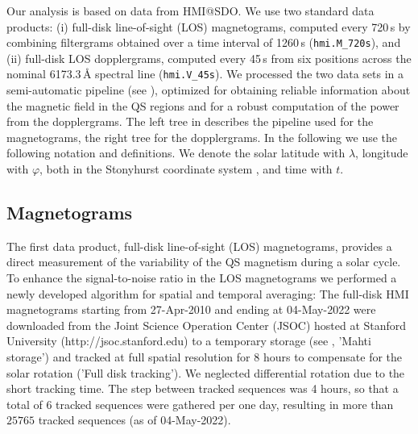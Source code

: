 \documentclass{aa}
\begin{document}
Our analysis is based on data from HMI@SDO. We use two standard data products: (i) full-disk line-of-sight (LOS) magnetograms, computed every 720\,s by combining filtergrams obtained over a time interval of 1260\,s (\texttt{hmi.M\_720s}), and (ii) full-disk LOS dopplergrams, computed every 45\,s from six positions across the nominal 6173.3\,\AA{} spectral line (\texttt{hmi.V\_45s}). We processed the two data sets in a semi-automatic pipeline (see ), optimized for obtaining reliable information about the magnetic field in the QS regions and for a robust computation of the \fff power from the dopplergrams. The left tree in  describes the pipeline used for the magnetograms, the right tree for the dopplergrams.
In the following we use the following notation and definitions. 
We denote the solar 
latitude with $\lambda$, longitude with $\varphi$, 
both in the Stonyhurst coordinate system \cite[]{Thomson06}, 
and time with $t$. 



\subsection{Magnetograms}

The first data product, full-disk line-of-sight (LOS) magnetograms, provides a direct measurement of the variability of the QS
magnetism during a solar cycle. To enhance the signal-to-noise ratio in the LOS magnetograms we performed a newly developed algorithm for spatial and temporal averaging: The full-disk HMI magnetograms starting from 27-Apr-2010 and ending at 
04-May-2022
were downloaded from the Joint Science Operation Center (JSOC) hosted at Stanford University (http://jsoc.stanford.edu) to a temporary storage (see , 'Mahti storage') and tracked at full spatial resolution for 8 hours to compensate for the solar rotation ('Full disk tracking').
We neglected differential rotation due to
the short tracking time.
The step between tracked sequences was 4 hours, so that a total of 6 tracked sequences were gathered per one day, resulting in more than 
$25765$ tracked sequences (as of 04-May-2022).
\end{document}
